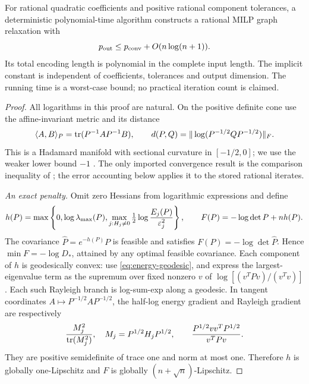 \begin{theorem}\label{thm:rational-finite}
For rational quadratic coefficients and positive rational component
tolerances, a deterministic polynomial-time algorithm constructs a rational
MILP graph relaxation with
\begin{equation}\label{eq:rational-finite-count}
 p_{\rm out}\le p_{\mathrm{conv}}+O(n\log(n+1)).
\end{equation}
Its total encoding length is polynomial in the complete input length.
The implicit constant is independent of coefficients, tolerances and
output dimension. The running time is a worst-case bound; no practical
iteration count is claimed.
\end{theorem}
\begin{proof}
All logarithms in this proof are natural. On the positive definite cone
use the affine-invariant metric and its distance
\[
 \langle A,B\rangle_P=\operatorname{tr}(P^{-1}AP^{-1}B),\qquad
 d(P,Q)=\|\log(P^{-1/2}QP^{-1/2})\|_F.
\]
This is a Hadamard manifold with sectional curvature in $[-1/2,0]$;
we use the weaker lower bound $-1$ \citep[Proposition I.1]{criscitiello2021}.
The only imported convergence result is the comparison inequality of
\citet[Corollary 8]{zhang2016}; the error accounting below applies it to
the stored rational iterates.

\emph{An exact penalty.} Omit zero Hessians from logarithmic expressions
and define
\begin{equation}\label{eq:exact-covariance-penalty}
 h(P)=\max\left\{0,\log\lambda_{\max}(P),
          \max_{j:H_j\ne0}\tfrac12\log\frac{E_j(P)}{\varepsilon_j^2}\right\},
 \qquad F(P)=-\log\det P+nh(P).
\end{equation}
The covariance $\widehat P=e^{-h(P)}P$ is feasible and satisfies
$F(P)=-\log\det\widehat P$. Hence $\min F=-\log D_*$, attained by any
optimal feasible covariance. Each component of $h$ is geodesically convex:
use \eqref{eq:energy-geodesic}, and express the largest-eigenvalue term
as the supremum over fixed nonzero $v$ of
$\log[(v^TPv)/(v^Tv)]$. Each such Rayleigh branch is log-sum-exp along a
geodesic. In tangent coordinates $A\mapsto P^{-1/2}AP^{-1/2}$, the
half-log energy gradient and Rayleigh gradient are respectively
\begin{equation}\label{eq:energy-gradients}
 \frac{M_j^2}{\operatorname{tr}(M_j^2)},\quad M_j=P^{1/2}H_jP^{1/2},
 \qquad \frac{P^{1/2}vv^TP^{1/2}}{v^TPv}.
\end{equation}
They are positive semidefinite of trace one and norm at most one.
Therefore $h$ is globally one-Lipschitz and $F$ is globally
$(n+\sqrt n)$-Lipschitz.


\end{proof}
